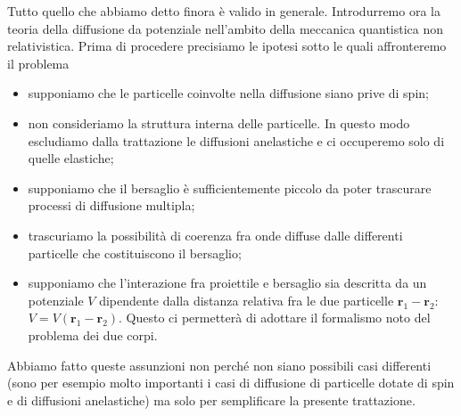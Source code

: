\documentclass[a4paper,fleqn,twoside,12pt]{article}
\begin{document}
Tutto quello che abbiamo detto finora è valido in generale.  Introdurremo ora la
teoria della diffusione da potenziale nell'ambito della meccanica quantistica
non relativistica.  Prima di procedere precisiamo le ipotesi sotto le quali
affronteremo il problema
\begin{itemize}
\item supponiamo che le particelle coinvolte nella diffusione siano prive di
  spin;
\item non consideriamo la struttura interna delle particelle.  In questo modo
  escludiamo dalla trattazione le diffusioni anelastiche e ci occuperemo solo di
  quelle elastiche;
\item supponiamo che il bersaglio è sufficientemente piccolo da poter trascurare
  processi di diffusione multipla;
\item trascuriamo la possibilità di coerenza fra onde diffuse dalle differenti
  particelle che costituiscono il bersaglio;
\item supponiamo che l'interazione fra proiettile e bersaglio sia descritta da
  un potenziale $V$ dipendente dalla distanza relativa fra le due particelle
  $\bm{r}_{1} - \bm{r}_{2}$: $V = V(\bm{r}_{1} - \bm{r}_{2})$.  Questo ci
  permetterà di adottare il formalismo noto del problema dei due corpi.
\end{itemize}
Abbiamo fatto queste assunzioni non perché non siano possibili casi differenti
(sono per esempio molto importanti i casi di diffusione di particelle dotate di
spin e di diffusioni anelastiche) ma solo per semplificare la presente
trattazione.
\end{document}
